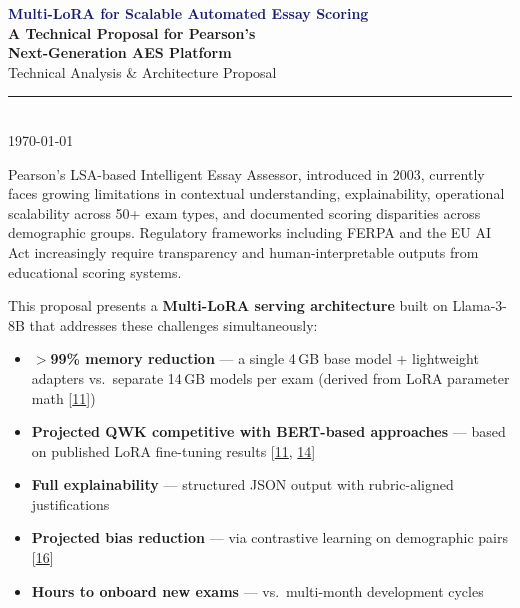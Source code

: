 \documentclass[12pt]{article}
\begin{document}
\thispagestyle{empty}

\begin{center}
    \vspace*{1.5cm}
    {\LARGE \textbf{\textcolor{MidnightBlue}{Multi-LoRA for Scalable Automated Essay Scoring}}}\\[8pt]
    {\Large \textbf{A Technical Proposal for Pearson's}}\\[4pt]
    {\Large \textbf{Next-Generation AES Platform}}\\[30pt]
    {\large Technical Analysis \& Architecture Proposal}\\[12pt]
    \noindent\rule{0.6\textwidth}{0.4pt}\\[12pt]
    {\today}\\[40pt]
\end{center}

\begin{keyinsight}
\singlespacing
Pearson's LSA-based Intelligent Essay Assessor, introduced in 2003, currently faces growing limitations in contextual understanding, explainability, operational scalability across 50+ exam types, and documented scoring disparities across demographic groups. Regulatory frameworks including FERPA and the EU AI Act increasingly require transparency and human-interpretable outputs from educational scoring systems.

\medskip
This proposal presents a \textbf{Multi-LoRA serving architecture} built on Llama-3-8B that addresses these challenges simultaneously:
\begin{itemize}[leftmargin=*, itemsep=2pt, topsep=4pt]
    \item \textbf{$>$99\% memory reduction} --- a single 4\,GB base model + lightweight adapters vs.\ separate 14\,GB models per exam (derived from LoRA parameter math [\hyperlink{ref11}{11}])
    \item \textbf{Projected QWK competitive with BERT-based approaches} --- based on published LoRA fine-tuning results [\hyperlink{ref11}{11}, \hyperlink{ref14}{14}]
    \item \textbf{Full explainability} --- structured JSON output with rubric-aligned justifications
    \item \textbf{Projected bias reduction} --- via contrastive learning on demographic pairs [\hyperlink{ref16}{16}]
    \item \textbf{Hours to onboard new exams} --- vs.\ multi-month development cycles
\end{itemize}
\end{keyinsight}
\end{document}
